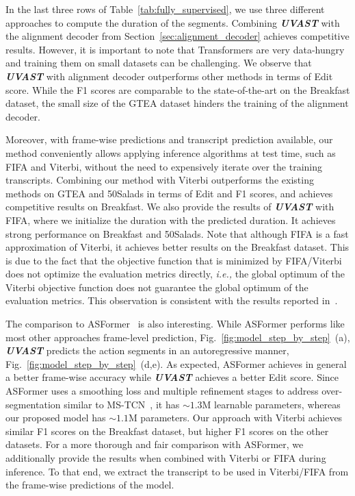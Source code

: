 In the last three rows of Table~\ref{tab:fully_supervised}, we use three different approaches to compute the duration of the segments.
Combining \textit{\textbf{UVAST}} with the alignment decoder from Section~\ref{sec:alignment_decoder} achieves competitive results. However, it is important to note that Transformers are very data-hungry and training them on small datasets can be challenging.
We observe that \textit{\textbf{UVAST}} with alignment decoder outperforms other methods in terms of Edit score. While the F1 scores are comparable to the state-of-the-art on the Breakfast dataset, the small size of the GTEA dataset hinders the training of the alignment decoder. 

Moreover, with frame-wise predictions and transcript prediction available, our method conveniently allows applying inference algorithms at test time, such as FIFA and Viterbi, without the need to expensively iterate over the training transcripts.
Combining our method with Viterbi outperforms the existing methods on GTEA and 50Salads in terms of Edit and F1 scores, and achieves competitive results on Breakfast. We also provide the results of \textit{\textbf{UVAST}} with FIFA, where we initialize the duration with the predicted duration. It achieves strong performance on Breakfast and 50Salads. Note that although FIFA is a fast approximation of Viterbi, it achieves better results on the Breakfast dataset. This is due to the fact that the objective function that is minimized by FIFA/Viterbi does not optimize the evaluation metrics directly, \textit{i.e.,} the global optimum of the Viterbi objective function does not guarantee the global optimum of the evaluation metrics. This observation is consistent with the results reported in~\cite{fifa2021}.     

The comparison to ASFormer~\cite{asformer} is also interesting. While ASFormer performs like most other approaches frame-level prediction, Fig.~\ref{fig:model_step_by_step}~(a), \textit{\textbf{UVAST}} predicts the action segments in an autoregressive manner, Fig.~\ref{fig:model_step_by_step}~(d,e). As expected, ASFormer achieves in general a better frame-wise accuracy while \textit{\textbf{UVAST}} achieves a better Edit score. Since ASFormer uses a smoothing loss and multiple refinement stages to address over-segmentation similar to MS-TCN~\cite{farha2019ms,li2020ms}, it has $\sim1.3$M learnable parameters, whereas our proposed model has $\sim1.1$M parameters. Our approach with Viterbi achieves similar F1 scores on the Breakfast dataset, but higher F1 scores on the other datasets.    
For a more thorough and fair comparison with ASFormer, we additionally provide the results when combined with Viterbi or FIFA during inference. To that end, we extract the transcript to be used in Viterbi/FIFA from the frame-wise predictions of the model.

